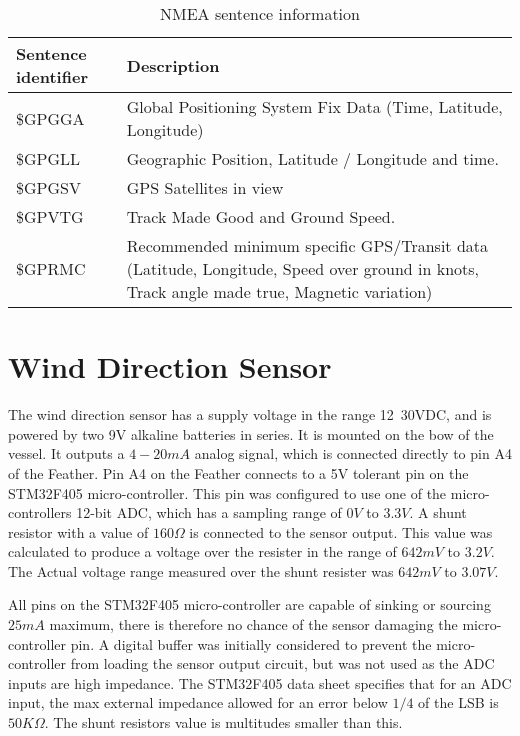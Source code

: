 \begin{table}[!h]
    \centering
    \caption{NMEA sentence information}
    \label{table:NMEA}
    \begin{tabular}{ | m{10em} | m{25em} | }
        
        \hline
        \textbf{Sentence identifier} & \textbf{Description} \\
        \hline
        \$GPGGA & Global Positioning System Fix Data (Time, Latitude, Longitude) \\
        \hline
        \$GPGLL & Geographic Position, Latitude / Longitude and time. \\
        \hline
        \$GPGSV & GPS Satellites in view \\
        \hline
        \$GPVTG & Track Made Good and Ground Speed. \\
        \hline
        \$GPRMC & Recommended minimum specific GPS/Transit data (Latitude, Longitude, Speed over ground in knots, Track angle made true, Magnetic variation) \\
        \hline
    \end{tabular}
\end{table}


\section{Wind Direction Sensor}
The wind direction sensor has a supply voltage in the range 12~30VDC, and is powered by two 9V alkaline batteries in series. It is mounted on the bow of the vessel.
It outputs a $4-20mA$ analog signal,
which is connected directly to pin A4 of the Feather. Pin A4 on the Feather connects to a 5V tolerant pin on the STM32F405 micro-controller. This pin was 
configured to use one of the micro-controllers 12-bit ADC, which has a sampling range of $0V$ to $3.3V$. A shunt resistor with a value of $160\Omega$ is 
connected to the sensor output. This value was calculated to produce a voltage over the resister in the range of $642mV$ to $3.2V$. The Actual voltage range
measured over the shunt resister was $642mV$ to $3.07V$.

All pins on the STM32F405 micro-controller are capable of sinking or sourcing $25mA$ maximum, there is therefore no chance of the sensor damaging the micro-controller
pin. A digital buffer was initially considered to prevent the micro-controller from loading the sensor output circuit, but was not used as the ADC inputs are
high impedance. The STM32F405 data sheet\cite{STM32F405-datasheet} specifies that for an ADC input, the max external impedance allowed for an error below $1/4$ of the LSB is $50K\Omega$. 
The shunt resistors value is multitudes smaller than this.     


